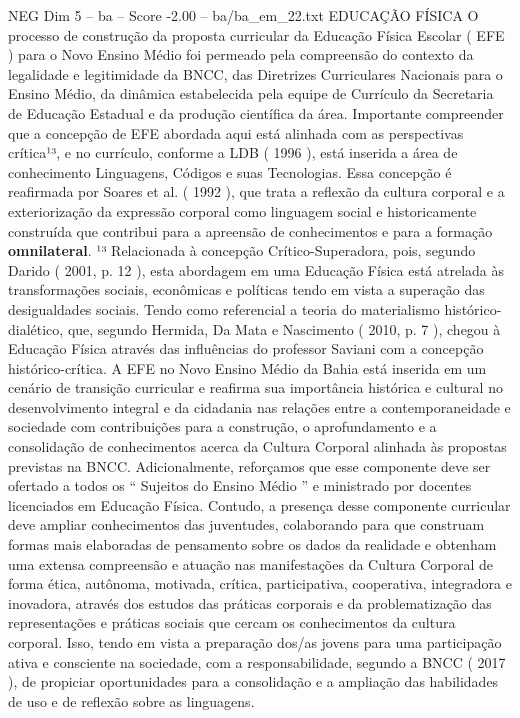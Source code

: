 \begin{textsample}{NEG Dim 5 – ba – Score -2.00 – ba/ba\_em\_22.txt}  \label{ex:f5_neg_019}
EDUCAÇÃO FÍSICA O processo de construção da proposta curricular da Educação Física Escolar ( EFE ) para o Novo Ensino Médio foi permeado pela compreensão do contexto da legalidade e legitimidade da BNCC, das Diretrizes Curriculares Nacionais para o Ensino Médio, da dinâmica estabelecida pela equipe de Currículo da Secretaria de Educação Estadual e da produção científica da área.
Importante compreender que a concepção de EFE abordada aqui está alinhada com as perspectivas crítica¹³, e no currículo, conforme a LDB ( 1996 ), está inserida a área de conhecimento Linguagens, Códigos e suas Tecnologias.
Essa concepção é reafirmada por Soares et al. ( 1992 ), que trata a reflexão da cultura corporal e a exteriorização da expressão corporal como linguagem social e historicamente construída que contribui para a apreensão de conhecimentos e para a formação \textbf{omnilateral}. ¹³ Relacionada à concepção Crítico-Superadora, pois, segundo Darido ( 2001, p. 12 ), esta abordagem em uma Educação Física está atrelada às transformações sociais, econômicas e políticas tendo em vista a superação das desigualdades sociais.
Tendo como referencial a teoria do materialismo histórico-dialético, que, segundo Hermida, Da Mata e Nascimento ( 2010, p. 7 ), chegou à Educação Física através das influências do professor Saviani com a concepção histórico-crítica.
A EFE no Novo Ensino Médio da Bahia está inserida em um cenário de transição curricular e reafirma sua importância histórica e cultural no desenvolvimento integral e da cidadania nas relações entre a contemporaneidade e sociedade com contribuições para a construção, o aprofundamento e a consolidação de conhecimentos acerca da Cultura Corporal alinhada às propostas previstas na BNCC.
Adicionalmente, reforçamos que esse componente deve ser ofertado a todos os “ Sujeitos do Ensino Médio ” e ministrado por docentes licenciados em Educação Física.
Contudo, a presença desse componente curricular deve ampliar conhecimentos das juventudes, colaborando para que construam formas mais elaboradas de pensamento sobre os dados da realidade e obtenham uma extensa compreensão e atuação nas manifestações da Cultura Corporal de forma ética, autônoma, motivada, crítica, participativa, cooperativa, integradora e inovadora, através dos estudos das práticas corporais e da problematização das representações e práticas sociais que cercam os conhecimentos da cultura corporal.
Isso, tendo em vista a preparação dos/as jovens para uma participação ativa e consciente na sociedade, com a responsabilidade, segundo a BNCC ( 2017 ), de propiciar oportunidades para a consolidação e a ampliação das habilidades de uso e de reflexão sobre as linguagens.

\end{textsample}
